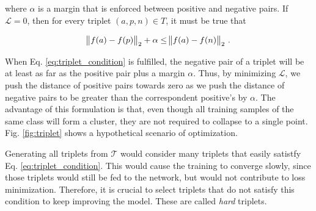 where $\alpha$ is a margin that is enforced between positive and negative pairs. If $\mathcal{L} = 0$, then for every triplet $(a, p, n) \in T$, it must be true that

\begin{equation}\label{eq:triplet_condition}
\norm{f(a) - f(p)}_2 + \alpha \leq \norm{f(a) - f(n)}_2 \,.
\end{equation}

When Eq. \ref{eq:triplet_condition} is fulfilled, the negative pair of a triplet will be at least as far as the positive pair plus a margin $\alpha$. Thus, by minimizing $\mathcal{L}$, we push the distance of positive pairs towards zero as we push the distance of negative pairs to be greater than the correspondent positive's by $\alpha$. The advantage of this formulation is that, even though all training samples of the same class will form a cluster, they are not required to collapse to a single point. Fig. \ref{fig:triplet} shows a hypothetical scenario of optimization.

Generating all triplets from $\mathcal{T}$ would consider many triplets that easily satistfy Eq. \ref{eq:triplet_condition}. This would cause the training to converge slowly, since those triplets would still be fed to the network, but would not contribute to loss minimization. Therefore, it is crucial to select triplets that do not satisfy this condition to keep improving the model. These are called \textit{hard} triplets.

